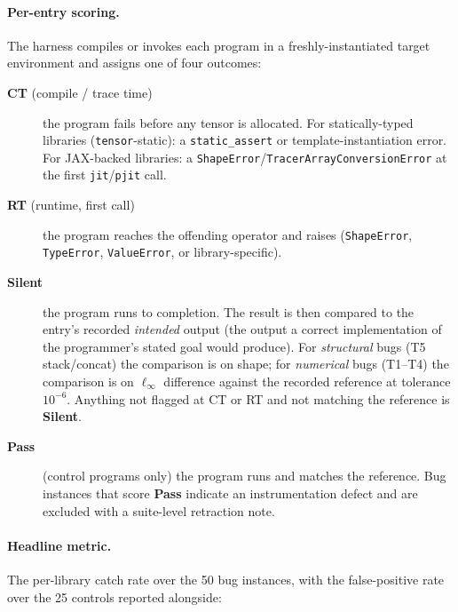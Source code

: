 \documentclass[10pt,twocolumn]{article}
\newcommand{\code}[1]{\texttt{#1}}
\begin{document}
\paragraph{Per-entry scoring.}
The harness compiles or invokes each program in a freshly-instantiated
target environment and assigns one of four outcomes:

\begin{description}
  \item[\textbf{CT} (compile / trace time)] the program fails before
        any tensor is allocated. For statically-typed libraries
        (\code{tensor}-static): a \code{static\_assert} or
        template-instantiation error. For JAX-backed libraries: a
        \code{ShapeError}/\code{TracerArrayConversionError} at the
        first \code{jit}/\code{pjit} call.
  \item[\textbf{RT} (runtime, first call)] the program reaches the
        offending operator and raises (\code{ShapeError},
        \code{TypeError}, \code{ValueError}, or library-specific).
  \item[\textbf{Silent}] the program runs to completion. The result
        is then compared to the entry's recorded \emph{intended}
        output (the output a correct implementation of the
        programmer's stated goal would produce). For \emph{structural}
        bugs (T5 stack/concat) the comparison is on shape; for
        \emph{numerical} bugs (T1--T4) the comparison is on $\ell_\infty$
        difference against the recorded reference at tolerance
        $10^{-6}$. Anything not flagged at CT or RT and not matching
        the reference is \textbf{Silent}.
  \item[\textbf{Pass}] (control programs only) the program runs and
        matches the reference. Bug instances that score \textbf{Pass}
        indicate an instrumentation defect and are excluded with a
        suite-level retraction note.
\end{description}

\paragraph{Headline metric.}
The per-library catch rate over the 50 bug instances, with the
false-positive rate over the 25 controls reported alongside:
\end{document}
